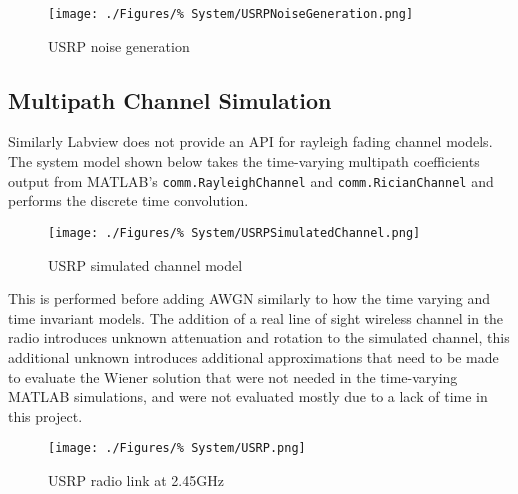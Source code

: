 \begin{figure}[ht]
	\texttt{[image: ./Figures/\%
	System/USRPNoiseGeneration.png]}
	\caption{USRP noise generation}
	\label{fig:USRPNoiseGen}
\end{figure}

\subsection{Multipath Channel Simulation}
\label{sec:USRPMultipathChannelSimulation}
Similarly Labview does not provide an API for rayleigh %
fading channel models. The system model shown below %
takes the time-varying multipath coefficients output %
from MATLAB's \texttt{comm.RayleighChannel} and %
\texttt{comm.RicianChannel} and performs the discrete time %
convolution.

\begin{figure}[ht]
	\texttt{[image: ./Figures/\%
	System/USRPSimulatedChannel.png]}
	\caption{USRP simulated channel model}
	\label{fig:USRPSimChan}
\end{figure}

This is performed before adding AWGN similarly to how the %
time varying and time invariant models. The addition of %
a real line of sight wireless channel in the radio introduces %
unknown attenuation and rotation to the simulated channel, %
this additional unknown introduces additional approximations %
that need to be made to evaluate the Wiener solution that %
were not needed in the time-varying MATLAB simulations, and %
were not evaluated mostly due to a lack of time in this project.

\begin{figure}[ht]
	\centering
	\texttt{[image: ./Figures/\%
	System/USRP.png]}
	\caption{USRP radio link at 2.45GHz}
	\label{fig:USRPChannel}
\end{figure}
